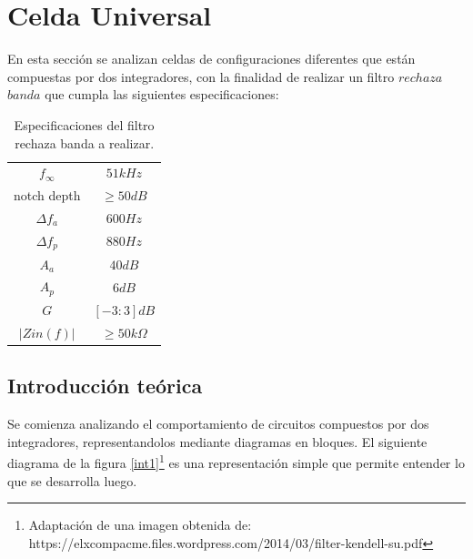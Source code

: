 \section{Celda Universal}

En esta secci\'on se analizan celdas de configuraciones diferentes que est\'an compuestas por dos integradores, con la finalidad de realizar un filtro $rechaza$  $banda$ que cumpla las siguientes especificaciones:

	\begin{table}[h!]
	\centering
	\begin{tabular}{c c}
		\hline
		$f_\infty$ & $51kHz$ \\ 
		notch depth &  $\geq 50dB$\\
		$\Delta f_a$ & $600Hz$\\
		$\Delta f_p$ & $880Hz$\\
		$A_a$ & $40dB$\\
		$A_p$ & $6dB$\\
		$G$ & $[-3:3]dB$\\
		$|Zin(f)|$ & $\geq 50k\Omega$\\		
		\hline
	\end{tabular}
	\caption{Especificaciones del filtro rechaza banda a realizar.}
	\label{especificaciones}
\end{table}

\subsection{Introducci\'on te\'orica}

Se comienza analizando el comportamiento de circuitos compuestos por dos integradores, representandolos mediante diagramas en bloques. El siguiente diagrama de la figura \ref{int1}\footnote{Adaptaci\'on de una imagen obtenida de: https://elxcompacme.files.wordpress.com/2014/03/filter-kendell-su.pdf} es una representaci\'on simple que permite entender lo que se desarrolla luego.

